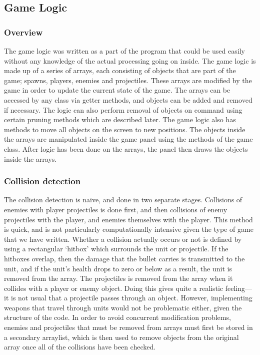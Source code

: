 \subsection{Game Logic}
\subsubsection{Overview}
The game logic was written as a part of the program that could be used easily without any knowledge of the actual processing going on inside. The game logic is made up of a series of arrays, each consisting of objects that are part of the game; spawns, players, enemies and projectiles. These arrays are modified by the game in order to update the current state of the game. The arrays can be accessed by any class via getter methods, and objects can be added and removed if necessary. The logic can also perform removal of objects on command using certain pruning methods which are described later. The game logic also has methods to move all objects on the screen to new positions. The objects inside the arrays are manipulated inside the game panel using the methods of the game class. After logic has been done on the arrays, the panel then draws the objects inside the arrays.
\subsubsection{Collision detection}
The collision detection is na\"{i}ve, and done in two separate stages. Collisions of enemies with player projectiles is done first, and then collisions of enemy projectiles with the player, and enemies themselves with the player. This method is quick, and is not particularly computationally intensive given the type of game that we have written. Whether a collision actually occurs or not is defined by using a rectangular `hitbox' which surrounds the unit or projectile. If the hitboxes overlap, then the damage that the bullet carries is transmitted to the unit, and if the unit's health drops to zero or below as a result, the unit is removed from the array. The projectiles is removed from the array when it collides with a player or enemy object. Doing this gives quite a realistic feeling---it is not usual that a projectile passes through an object. However, implementing weapons that travel through units would not be problematic either, given the structure of the code. In order to avoid concurrent modification problems, enemies and projectiles that must be removed from arrays must first be stored in a secondary arraylist, which is then used to remove objects from the original array once all of the collisions have been checked.
